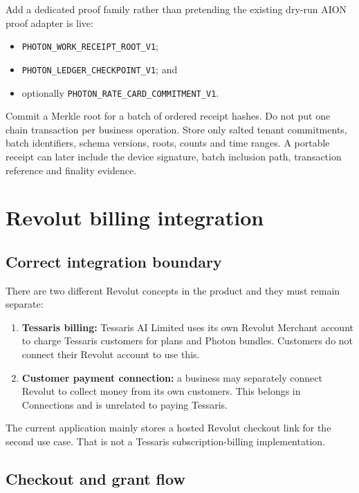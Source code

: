 \documentclass[11pt]{article}
\newcommand{\code}[1]{\texttt{#1}}
\begin{document}
Add a dedicated proof family rather than pretending the existing dry-run AION proof adapter is live:

\begin{itemize}
  \item \code{PHOTON\_WORK\_RECEIPT\_ROOT\_V1};
  \item \code{PHOTON\_LEDGER\_CHECKPOINT\_V1}; and
  \item optionally \code{PHOTON\_RATE\_CARD\_COMMITMENT\_V1}.
\end{itemize}

Commit a Merkle root for a batch of ordered receipt hashes. Do not put one chain transaction per business operation. Store only salted tenant commitments, batch identifiers, schema versions, roots, counts and time ranges. A portable receipt can later include the device signature, batch inclusion path, transaction reference and finality evidence.

\section{Revolut billing integration}

\subsection{Correct integration boundary}

There are two different Revolut concepts in the product and they must remain separate:

\begin{enumerate}
  \item \textbf{Tessaris billing:} Tessaris AI Limited uses its own Revolut Merchant account to charge Tessaris customers for plans and Photon bundles. Customers do not connect their Revolut account to use this.
  \item \textbf{Customer payment connection:} a business may separately connect Revolut to collect money from its own customers. This belongs in Connections and is unrelated to paying Tessaris.
\end{enumerate}

The current application mainly stores a hosted Revolut checkout link for the second use case. That is not a Tessaris subscription-billing implementation.

\subsection{Checkout and grant flow}
\end{document}
